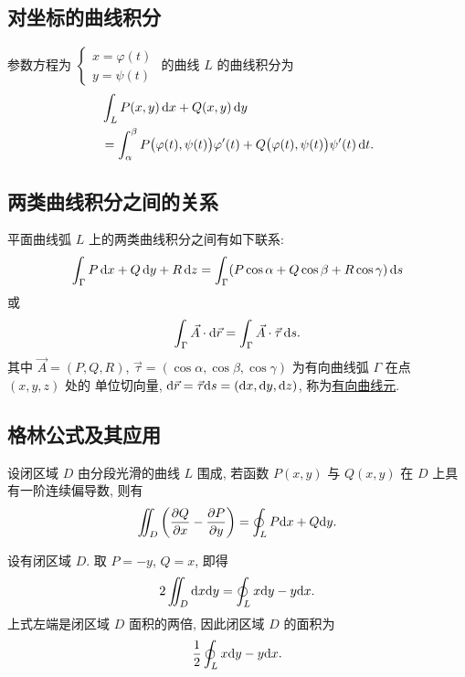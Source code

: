 \documentclass[a4paper,10pt,fleqn]{article}
\newcommand{\pdif}[2]{\frac{\partial #1}{\partial #2}}
\begin{document}
\subsection{对坐标的曲线积分}

\begin{thm}
    参数方程为 $\begin{cases}x=\varphi(t)\\y=\psi(t)\end{cases}$ 的曲线 $L$ 的曲线积分为
    \begin{align*}
         & \int_LP(x,y)\,{\rm d}x+Q(x,y)\,{\rm d}y                                                                      \\
         & =\int_\alpha^\beta P\big(\varphi(t),\psi(t)\big)\varphi'(t)+Q\big(\varphi(t),\psi(t)\big)\psi'(t)\,{\rm d}t.
    \end{align*}
\end{thm}

\subsection*{两类曲线积分之间的关系}

平面曲线弧 $L$ 上的两类曲线积分之间有如下联系:
\[
    \int_\Gamma P\,{\rm d}x+Q\,{\rm d}y+R\,{\rm d}z=\int_\Gamma(P\cos\alpha+Q\cos\beta+R\cos\gamma)\,{\rm d}s
\]
或
\[
    \int_\Gamma\vec{A}\cdot{\rm d}\vec{r}=\int_\Gamma\vec{A}\cdot\vec{\tau}\,{\rm d}s.
\]
其中 $\vec{A}=(P,Q,R)$, $\vec{\tau}=(\cos\alpha,\cos\beta,\cos\gamma)$ 为有向曲线弧 $\Gamma$ 在点 $(x,y,z)$ 处的
单位切向量, ${\rm d}\vec{r}=\vec{\tau}{\rm d}s=({\rm d}x,{\rm d}y,{\rm d}z)$, 称为\uline{有向曲线元}.

\subsection{格林公式及其应用}

\begin{thm}[格林公式]
    设闭区域 $D$ 由分段光滑的曲线 $L$ 围成, 若函数 $P(x,y)$ 与 $Q(x,y)$ 在 $D$ 上具有一阶连续偏导数, 则有
    \[
        \iint_D\left(\pdif{Q}{x}-\pdif{P}{y}\right)=\oint_LP{\rm d}x+Q{\rm d}y.
    \]
\end{thm}

\begin{attn}
    设有闭区域 $D$. 取 $P=-y$, $Q=x$, 即得
    \[
        2\iint_D{\rm d}x{\rm d}y=\oint_Lx{\rm d}y-y{\rm d}x.
    \]
    上式左端是闭区域 $D$ 面积的两倍, 因此闭区域 $D$ 的面积为
    \[
        \frac{1}{2}\oint_Lx{\rm d}y-y{\rm d}x.
    \]
\end{attn}
\end{document}
